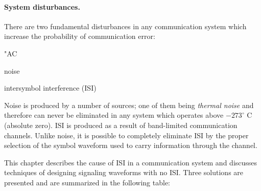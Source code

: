 \paragraph{System disturbances.}
There are two fundamental disturbances in any communication system
which increase the probability of communication error:
\begin{dingautolist}{"AC}
   \item noise
   \item intersymbol interference (ISI)
\end{dingautolist}
Noise is produced by a number of sources;
one of them being {\em thermal noise} and therefore can
never be eliminated in any system which operates
above $-273^\circ$ C (absolute zero).
ISI is produced as a result of band-limited communication channels.
Unlike noise, it is possible to completely eliminate ISI
by the proper selection of the symbol waveform used to
carry information through the channel.

This chapter describes the cause of ISI in a communication system
and discusses techniques of designing signaling waveforms
with no ISI.
Three solutions are presented and are summarized in the following table:

